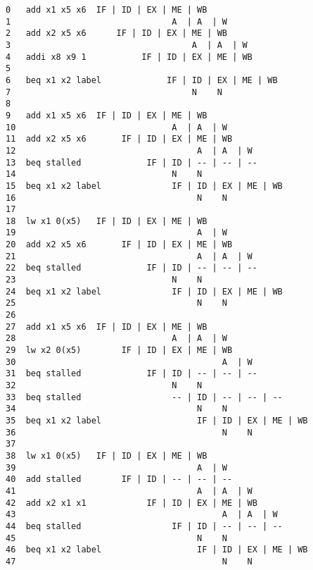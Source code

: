\documentclass[varwidth]{standalone}
\begin{document}
  \begin{BVerbatim}[]
0   add x1 x5 x6  IF | ID | EX | ME | WB
1                                A  | A  | W
2   add x2 x5 x6      IF | ID | EX | ME | WB
3                                    A  | A  | W
4   addi x8 x9 1           IF | ID | EX | ME | WB
5
6   beq x1 x2 label             IF | ID | EX | ME | WB
7                                    N    N
8
9   add x1 x5 x6  IF | ID | EX | ME | WB
10                               A  | A  | W
11  add x2 x5 x6       IF | ID | EX | ME | WB
12                                    A  | A  | W
13  beq stalled             IF | ID | -- | -- | --
14                               N    N
15  beq x1 x2 label              IF | ID | EX | ME | WB
16                                    N    N
17
18  lw x1 0(x5)   IF | ID | EX | ME | WB
19                                    A  | W
20  add x2 x5 x6       IF | ID | EX | ME | WB
21                                    A  | A  | W
22  beq stalled             IF | ID | -- | -- | --
23                               N    N
24  beq x1 x2 label              IF | ID | EX | ME | WB
25                                    N    N
26
27  add x1 x5 x6  IF | ID | EX | ME | WB
28                               A  | A  | W
29  lw x2 0(x5)        IF | ID | EX | ME | WB
30                                         A  | W
31  beq stalled             IF | ID | -- | -- | --
32                               N    N
33  beq stalled                  -- | ID | -- | -- | --
34                                    N    N
35  beq x1 x2 label                   IF | ID | EX | ME | WB
36                                         N    N
37
38  lw x1 0(x5)   IF | ID | EX | ME | WB
39                                    A  | W
40  add stalled        IF | ID | -- | -- | --
41                                    A  | A  | W
42  add x2 x1 x1            IF | ID | EX | ME | WB
43                                         A  | A  | W
44  beq stalled                  IF | ID | -- | -- | --
45                                    N    N
46  beq x1 x2 label                   IF | ID | EX | ME | WB
47                                         N    N
  \end{BVerbatim}
\end{document}
